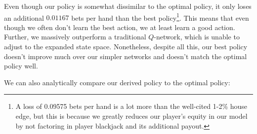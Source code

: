 \documentclass{article}
\begin{document}
Even though our policy is somewhat dissimilar to the optimal policy, it only loses an additional $0.01167$ bets per hand than the best policy\footnote{A loss of 0.09575 bets per hand is a lot more than the well-cited 1-2\% house edge, but this is because we greatly reduces our player's equity in our model by not factoring in player blackjack and its additional payout.}. This means that even though we often don't learn the best action, we at least learn a good action. Further, we massively outperform a traditional $Q$-network, which is unable to adjust to the expanded state space. Nonetheless, despite all this, our best policy doesn't improve much over our simpler networks and doesn't match the optimal policy well.

We can also analytically compare our derived policy to the optimal policy: 
\end{document}
